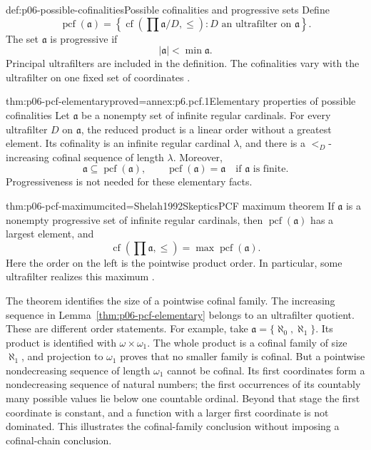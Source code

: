 \begin{hbdefinition}{def:p06-possible-cofinalities}{Possible cofinalities and progressive sets}
Define
\[
 \operatorname{pcf}(\mathfrak a)
   =\left\{\operatorname{cf}\!\left(\prod\mathfrak a/D,\leq\right):
                                  D\text{ an ultrafilter on }\mathfrak a\right\}.
\]
The set \(\mathfrak a\) is progressive if
\[
 |\mathfrak a|<\min\mathfrak a.
\]
Principal ultrafilters are included in the definition.
The cofinalities vary with the ultrafilter on one fixed set of coordinates
\cite[Definition~4.1]{Shelah1992Skeptics}.
\end{hbdefinition}

\begin{hblemma}{thm:p06-pcf-elementary}{proved=annex:p6.pcf.1}{Elementary properties of possible cofinalities}
Let \(\mathfrak a\) be a nonempty set of infinite regular cardinals.
For every ultrafilter \(D\) on \(\mathfrak a\), the reduced product
is a linear order without a greatest element.
Its cofinality is an infinite regular cardinal \(\lambda\), and
there is a \(<_D\)-increasing cofinal sequence of length \(\lambda\).
Moreover,
\[
 \mathfrak a\subseteq\operatorname{pcf}(\mathfrak a),
 \qquad
 \operatorname{pcf}(\mathfrak a)=\mathfrak a
       \quad\text{if }\mathfrak a\text{ is finite}.
\]
Progressiveness is not needed for these elementary facts.
\end{hblemma}

\begin{hbtheorem}{thm:p06-pcf-maximum}{cited=Shelah1992Skeptics}{PCF maximum theorem}
If \(\mathfrak a\) is a nonempty progressive set of infinite regular
cardinals, then \(\operatorname{pcf}(\mathfrak a)\) has a largest element,
and
\[
 \operatorname{cf}\!\left(\prod\mathfrak a,\leq\right)
       =\max\operatorname{pcf}(\mathfrak a).
\]
Here the order on the left is the pointwise product order.
In particular, some ultrafilter realizes this maximum
\cite[Main Theorem~4.3]{Shelah1992Skeptics}.
\end{hbtheorem}

The theorem identifies the size of a pointwise cofinal family.
The increasing sequence in Lemma~\ref{thm:p06-pcf-elementary} belongs
to an ultrafilter quotient.  These are different order statements.
For example, take \(\mathfrak a=\{\aleph_0,\aleph_1\}\).
Its product is identified with \(\omega\times\omega_1\).
The whole product is a cofinal family of size \(\aleph_1\), and
projection to \(\omega_1\) proves that no smaller family is cofinal.
But a pointwise nondecreasing sequence of length \(\omega_1\) cannot
be cofinal.  Its first coordinates form a nondecreasing sequence of
natural numbers; the first occurrences of its countably many possible
values lie below one countable ordinal.  Beyond that stage the first
coordinate is constant, and a function with a larger first coordinate
is not dominated.  This illustrates the cofinal-family conclusion
without imposing a cofinal-chain conclusion.

